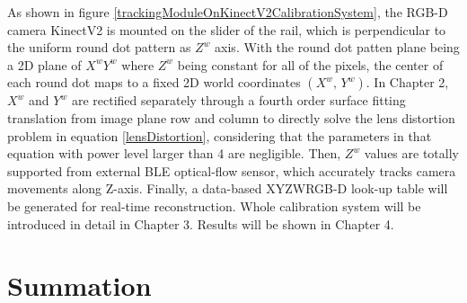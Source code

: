 As shown in figure \ref{trackingModuleOnKinectV2CalibrationSystem}, the RGB-D camera KinectV2 is mounted on the slider of the rail, which is perpendicular to the uniform round dot pattern as \(Z^{w}\) axis. With the round dot patten plane being a 2D plane of \(X^wY^w\) where \(Z^{w}\) being constant for all of the pixels, the center of each round dot maps to a fixed 2D world coordinates  \((X^w, \, Y^w)\). In Chapter 2, \(X^{w}\) and \(Y^{w}\) are rectified separately through a fourth order surface fitting translation from image plane row and column to directly solve the lens distortion problem in equation \ref{lensDistortion}, considering that the parameters in that equation with power level larger than 4 are negligible. Then, \(Z^{w}\) values are totally supported from external BLE optical-flow sensor, which accurately tracks camera movements along Z-axis. Finally, a data-based XYZWRGB-D look-up table will be generated for real-time reconstruction. Whole calibration system will be introduced in detail in Chapter 3. Results will be shown in Chapter 4.





\section{Summation}













































